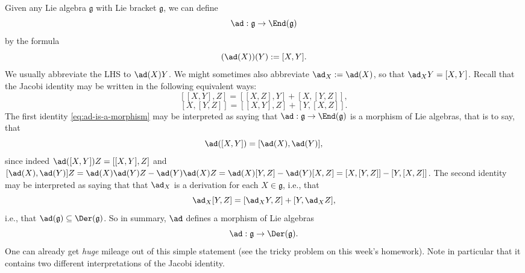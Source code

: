\documentclass[reqno]{amsart} 
\begin{document}
\begin{definition}
  Given any Lie algebra $\mathfrak{g}$
  with Lie bracket $\mathfrak{g}$,
  we can define
  \begin{equation*}
    \ad : \mathfrak{g} \rightarrow \End(\mathfrak{g})
  \end{equation*}
  by the formula
  \begin{equation*}
    (\ad(X))(Y) := [X,Y].
  \end{equation*}
  We usually abbreviate the LHS to $\ad(X) Y$.
  We might sometimes also abbreviate $\ad_X := \ad(X)$,
  so that $\ad_X Y = [X,Y]$.
  Recall that
  the Jacobi identity may be written
  in the following equivalent ways:
  \begin{equation}\label{eq:ad-is-a-morphism}
    {}    [[X,Y],Z] = [[X,Z],Y] + [X,[Y,Z]],
  \end{equation}
  \begin{equation}\label{eq:ad-X-is-a-derivation}
    {}    [X,[Y,Z]] = [[X,Y],Z] + [Y,[X,Z]].
  \end{equation}
  The first identity \eqref{eq:ad-is-a-morphism}
  may be interpreted as saying that $\ad : \mathfrak{g}
  \rightarrow \End(\mathfrak{g})$
  is a morphism of Lie algebras,
  that is to say,
  that
  \begin{equation*}
    \ad([X,Y]) = [\ad(X),\ad(Y)],
  \end{equation*}
  since indeed
  $\ad([X,Y]) Z = [[X,Y],Z]$
  and
  $[\ad(X),\ad(Y)] Z
  = \ad(X) \ad(Y) Z - \ad(Y) \ad(X) Z
  = \ad(X) [Y,Z] - \ad(Y) [X,Z]
  = [X,[Y,Z]] - [Y,[X,Z]]$.
  The second identity may be interpreted
  as saying that
  that $\ad_X$ is a derivation for each $X \in \mathfrak{g}$,
  i.e.,
  that
  \begin{equation*}
    \ad_X [Y,Z] = [\ad_X Y, Z] + [Y,\ad_X Z],
  \end{equation*}
  i.e., that
  $\ad(\mathfrak{g}) \subseteq \Der(\mathfrak{g})$.
  So in summary, $\ad$ defines a morphism of Lie algebras
  \begin{equation*}
    \ad : \mathfrak{g} \rightarrow \Der(\mathfrak{g}).
  \end{equation*}
  One can already get \emph{huge} mileage out
  of this simple statement (see the tricky problem on this week's homework).
   Note in particular that it contains
  two different interpretations of the Jacobi identity.
\end{definition}
\end{document}
